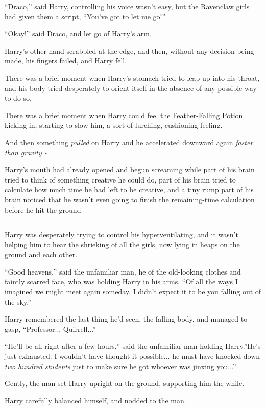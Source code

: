 ``Draco,'' said Harry, controlling his voice wasn't easy, but the
Ravenclaw girls had given them a script, ``You've got to let me go!''

``Okay!'' said Draco, and let go of Harry's arm.

Harry's other hand scrabbled at the edge, and then, without any decision
being made, his fingers failed, and Harry fell.

There was a brief moment when Harry's stomach tried to leap up into his
throat, and his body tried desperately to orient itself in the absence
of any possible way to do so.

There was a brief moment when Harry could feel the Feather-Falling
Potion kicking in, starting to slow him, a sort of lurching, cushioning
feeling.

And then something \emph{pulled} on Harry and he accelerated downward
again \emph{faster than gravity -}

Harry's mouth had already opened and begun screaming while part of his
brain tried to think of something creative he could do, part of his
brain tried to calculate how much time he had left to be creative, and a
tiny rump part of his brain noticed that he wasn't even going to finish
the remaining-time calculation before he hit the ground -

\begin{center}\rule{3in}{0.4pt}\end{center}

Harry was desperately trying to control his hyperventilating, and it
wasn't helping him to hear the shrieking of all the girls, now lying in
heaps on the ground and each other.

``Good heavens,'' said the unfamiliar man, he of the old-looking clothes
and faintly scarred face, who was holding Harry in his arms. ``Of all
the ways I imagined we might meet again someday, I didn't expect it to
be you falling out of the sky.''

Harry remembered the last thing he'd seen, the falling body, and managed
to gasp, ``Professor... Quirrell...''

``He'll be all right after a few hours,'' said the unfamiliar man
holding Harry.''He's just exhausted. I wouldn't have thought it
possible... he must have knocked down \emph{two hundred students}
just to make sure he got whoever was jinxing you...''

Gently, the man set Harry upright on the ground, supporting him the
while.

Harry carefully balanced himself, and nodded to the man.

